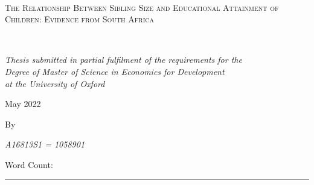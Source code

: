 \begin{titlepage}
	\centering
	\vspace*{1.5cm}
	\hrulefill\\
	\vspace{0.5cm}
	{\scshape\LARGE The Relationship Between Sibling Size and Educational Attainment of Children: Evidence from South Africa\par}
	\vspace{0.5cm}
	\hrulefill\\
	\vspace{1.5cm}

	{\normalsize\itshape Thesis submitted in partial fulfilment of the requirements for the\\
Degree of Master of Science in Economics for Development\\
at the University of Oxford\par}
	
	\vspace{0.6cm}

	\vspace{2.8cm}
	{\normalsize May 2022 \par}
	
	
	\vspace{1.2cm}
	{\normalsize By \par}
	
	\vspace{1.2cm}
	{\large\itshape A16813S1 = 1058901}
	
	
	\vspace{2.5cm}
	{\normalsize Word Count: \rule{1cm}{0.4pt}}


\end{titlepage}